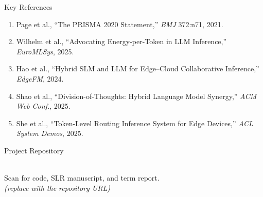 \begin{block}{Key References}
  \small
  \begin{enumerate}
    \item Page et al., ``The PRISMA 2020 Statement,'' \textit{BMJ} 372:n71, 2021.
    \item Wilhelm et al., ``Advocating Energy-per-Token in LLM Inference,''
          \textit{EuroMLSys}, 2025.
    \item Hao et al., ``Hybrid SLM and LLM for Edge--Cloud Collaborative Inference,''
          \textit{EdgeFM}, 2024.
    \item Shao et al., ``Division-of-Thoughts: Hybrid Language Model Synergy,''
          \textit{ACM Web Conf.}, 2025.
    \item She et al., ``Token-Level Routing Inference System for Edge Devices,''
          \textit{ACL System Demos}, 2025.
  \end{enumerate}
\end{block}

\begin{block}{Project Repository}
  \begin{center}
    \\[6pt]
    \footnotesize Scan for code, SLR manuscript, and term report.\\
    \footnotesize \textit{(replace with the repository URL)}
  \end{center}
\end{block}
